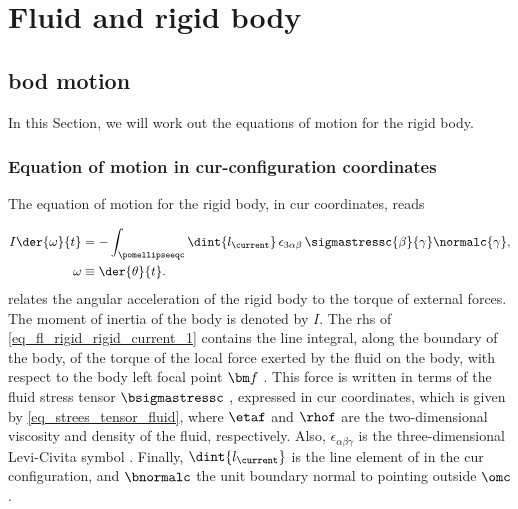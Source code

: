 \section{Fluid and rigid body}\label{app_sec_fl_rigid}


\subsection{\Acl{bod} motion}\label{sec_rigid_body_body}

In this Section, we will work out the equations of motion for the rigid body.

\subsubsection{Equation of motion in  \acl{cur}-configuration coordinates}\label{sec_rigid_body_body_current}

The equation of motion for the rigid body, in \ac{cur} coordinates, reads \cite{goldsteinClassicalMechanics2004}

\begin{align}
        \label{eq_fl_rigid_rigid_current_1}
        I         \der{\omega}{t}
               & =                                                                                             - \int_\pomellipseeqc \dint{l_\current} \, \epsilon_{3 \alpha \beta} \, \sigmastressc{\beta}{\gamma} \normalc{\gamma} , \\
        \label{eq_fl_rigid_rigid_current_2}
        \omega & \equiv \der{\theta}{t}.
\end{align}
 relates the angular acceleration of the rigid body to the torque of external forces.
The moment of inertia of the body is denoted by $I$. The \ac{rhs} of \cref{eq_fl_rigid_rigid_current_1} contains the line integral, along the boundary of the body, of the torque of the local force exerted by  the fluid on  the body, with respect to the body left focal point $\bfocalpoint$ \cite{landauFluidMechanics1987}.
This force is written in terms of the fluid stress tensor $\bsigmastressc$ \cite{landauFluidMechanics1987}, expressed in \ac{cur} coordinates, which is given by \cref{eq_strees_tensor_fluid}, where $\etaf$ and $\rhof$ are the two-dimensional viscosity and density of the fluid, respectively.
Also, $\epsilon_{\alpha \beta \gamma}$ is the three-dimensional Levi-Civita symbol \cite{marchiafavaAppuntiDiGeometria2005}.
Finally,   $\dint{l_\current}$ is the line element of \pomellipsec in the \ac{cur} configuration, and $\bnormalc$ the unit boundary normal to \pomellipsec pointing outside $\omc$.




